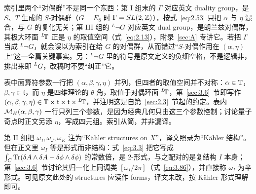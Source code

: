 \begin{yizhu}[易错点]
索引里两个“对偶群”不是同一个东西：第 I 组末的 $\Gamma$ 对应英文 duality group，是 $S$、$T$ 生成的 $S$-对偶群（$G=E_8$ 时 $\Gamma=SL(2,{\mathbb{Z}})$），按式~\eqref{eq:2.53} 只把 $\alpha$ 与 $\eta$ 混合，与 $G$ 的复化无关；第 III 组的 $^L\neg G$ 对应英文 dual group，是朗兰兹对偶群，其极大环面 $^L\negthinspace{\mathbb{T}}$ 正是 $\eta$ 的取值空间（式~\eqref{eq:2.13}），附录~\ref{sec:A} 专讲它。若把 $\Gamma$ 当成 $^L\neg G$，就会误以为索引在给 $G$ 的对偶群，从而错过“$S$-对偶作用在 $(\alpha,\eta)$ 上”这一全篇关键事实。另：$^L\neg G$ 里的符号是原文定义的负细空格，不是逻辑非，排出来即 $^LG$，改稿时不要“纠正”它。
\end{yizhu}

\begin{yizhu}[易错点]
表中面算符参数一行把 $(\alpha,\beta,\gamma,\eta)$ 并列，但四者的取值空间并不对称：$\alpha\in{\mathbb{T}}$，$\beta,\gamma\in\mathfrak t$，而 $\eta$ 是四维理论的 $\theta$ 角，取值于对偶环面 $^L\negthinspace{\mathbb{T}}$，第~\ref{sec:3.6}~节即写作 $(\alpha,\beta,\gamma,\eta)\in{\mathbb{T}}\times\mathfrak t\times\mathfrak t\times{}^L\negthinspace{\mathbb{T}}$，并注明这是自第~\ref{sec:2.3}~节起的约定。表内 ${{\mathcal{M}}_H}(\alpha,\beta,\gamma)$ 一行只列三个参数，是因为经典几何只由这三个参数控制；讨论量子奇点时正文另添 $\eta$，写成四元组。索引从简，并非漏译。
\end{yizhu}

\begin{yizhu}[原文疑误]
第 II 组把 $\omega_I,\omega_J,\omega_K$ 注为“Kähler structures on $X$”，译文照录为“Kähler 结构”。但在正文里 $\omega_I$ 等是形式而非结构：式~\eqref{eq:3.3} 把它写成 $\int_C{\rm Tr}(\delta A\wedge\delta A-\delta\phi\wedge\delta\phi)$ 的常数倍，是 2-形式，与之配对的是复结构 $I$ 本身；第~\ref{sec:3.6}~节讨论其归一化上同调类 $[\omega_I/2\pi]$（式~\eqref{eq:3.86}），并直接称 $\omega_I$ 为辛形式。可见原文此处的 structures 应读作 forms，译文未改，按 Kähler 形式理解即可。
\end{yizhu}
